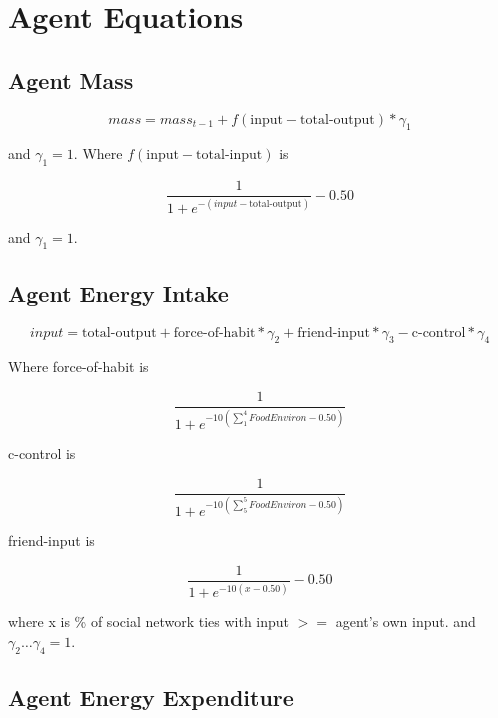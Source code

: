 \documentclass[12pt]{article}
\begin{document}
\section{Agent Equations}

\subsection{Agent Mass}

\begin{equation}
mass = mass_{t-1} + f(\text{input} - \text{total-output}) * \gamma_1
\end{equation}

and $\gamma_1 = 1$. Where $f(\text{input} - \text{total-input})$ is

\begin{equation}
\frac{1}{1 + e^{-(input - \text{total-output})}} - 0.50
\end{equation}

and $\gamma_1 = 1$.


\subsection{Agent Energy Intake}

\begin{equation}
input = \text{total-output} + \text{force-of-habit} * \gamma_2 + \text{friend-input} * \gamma_3 - \text{c-control}* \gamma_4
\end{equation}

Where force-of-habit is

\begin{equation}
\frac{1}{1 + e^{-10(\sum_{1}^{4}FoodEnviron - 0.50)}}
\end{equation}

c-control is

\begin{equation}
\frac{1}{1 + e^{-10(\sum_{5}^{5}FoodEnviron - 0.50)}}
\end{equation}

friend-input is

\begin{equation}
\frac{1}{1 + e^{-10(x - 0.50)}} - 0.50
\end{equation}

where x is \% of social network ties with input $>=$ agent's own input. and $ \gamma_2 \ldots \gamma_4 = 1$.

\subsection{Agent Energy Expenditure}
\end{document}
